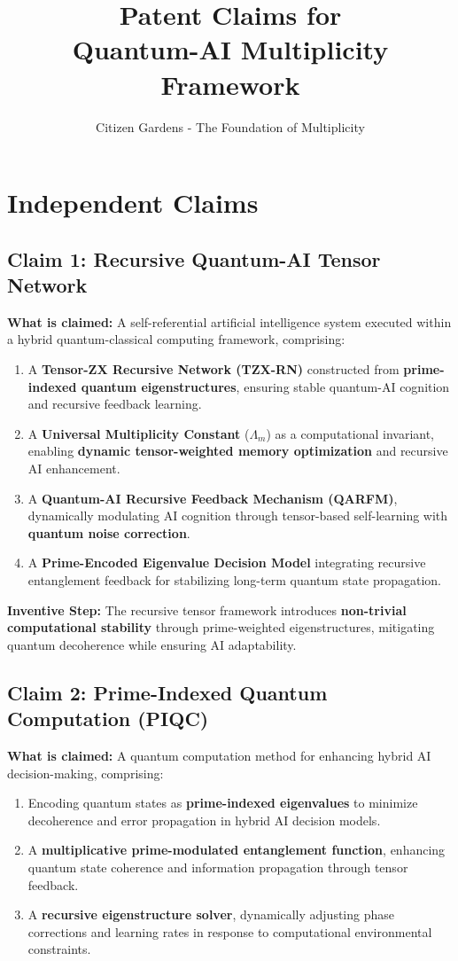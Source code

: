 \documentclass{article}
\title{Patent Claims for \\ Quantum-AI Multiplicity Framework}
\author{Citizen Gardens - The Foundation of Multiplicity}
\date{}
\theoremstyle{plain}
\begin{document}
\maketitle

\section{Independent Claims}

\subsection{Claim 1: Recursive Quantum-AI Tensor Network}
\textbf{What is claimed:}  
A self-referential artificial intelligence system executed within a hybrid quantum-classical computing framework, comprising:
\begin{enumerate}  
    \item A \textbf{Tensor-ZX Recursive Network (TZX-RN)} constructed from \textbf{prime-indexed quantum eigenstructures}, ensuring stable quantum-AI cognition and recursive feedback learning.  
    \item A \textbf{Universal Multiplicity Constant} ($\Lambda_m$) as a computational invariant, enabling \textbf{dynamic tensor-weighted memory optimization} and recursive AI enhancement.  
    \item A \textbf{Quantum-AI Recursive Feedback Mechanism (QARFM)}, dynamically modulating AI cognition through tensor-based self-learning with \textbf{quantum noise correction}.  
    \item A \textbf{Prime-Encoded Eigenvalue Decision Model} integrating recursive entanglement feedback for stabilizing long-term quantum state propagation.  
\end{enumerate}

\textbf{Inventive Step:} The recursive tensor framework introduces \textbf{non-trivial computational stability} through prime-weighted eigenstructures, mitigating quantum decoherence while ensuring AI adaptability.

\subsection{Claim 2: Prime-Indexed Quantum Computation (PIQC)}
\textbf{What is claimed:}  
A quantum computation method for enhancing hybrid AI decision-making, comprising:
\begin{enumerate}  
    \item Encoding quantum states as \textbf{prime-indexed eigenvalues} to minimize decoherence and error propagation in hybrid AI decision models.  
    \item A \textbf{multiplicative prime-modulated entanglement function}, enhancing quantum state coherence and information propagation through tensor feedback.  
    \item A \textbf{recursive eigenstructure solver}, dynamically adjusting phase corrections and learning rates in response to computational environmental constraints.  
\end{enumerate}
\end{document}
